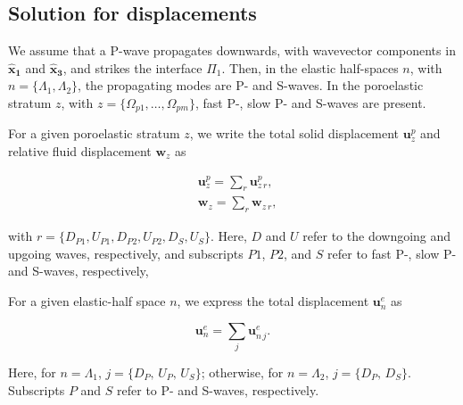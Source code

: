 \documentclass[draft]{agujournal2019}
\begin{document}
\subsection{Solution for displacements}
We assume that a P-wave propagates downwards, with wavevector components in $\bm{\hat x_1}$ and  $\bm{\hat x_3}$, and strikes the interface $\Pi_1$.  Then, in the elastic half-spaces $n$, with $n =\{\Lambda_1,\Lambda_2\}$, the propagating modes  are P- and S-waves. In the poroelastic stratum $z$, with $z=\{\Omega_{p1},\dots,\Omega_{pm}\}$, fast P-, slow P- and S-waves are present.

For a given poroelastic stratum $z$, we write the total solid displacement $\bm{u}_z^p$  and relative fluid displacement $\bm{w}_z$ as
\begin{linenomath*}
\begin{equation}\label{Eq.a7}
\begin{split}
& \bm{u}_z^{p} =  \sum_r \bm{u}_{z\,r}^p, \\
& \bm{w}_z =  \sum_r \bm{w}_{z\,r},
\end{split}
\end{equation}
\end{linenomath*}
with $r=\{D_{P1},U_{P1},D_{P2},U_{P2},D_{S},U_{S}\}$. Here, $D$ and $U$ refer to the downgoing and upgoing waves, respectively, and subscripts $P1$, $P2$, and $S$ refer to fast P-, slow P- and S-waves, respectively,

For a given elastic-half space $n$,  we express the total displacement $\bm{u}_n^e$ as
\begin{linenomath*}
\begin{equation}\label{Eq.a8}
\bm{u}_n^{e} =  \sum_j \bm{u}_{n\,j}^e.
\end{equation}
\end{linenomath*}
Here, for $n =\Lambda_1 $,  $j=\{D_P,\,U_P,\,U_S\}$; otherwise, for $n =\Lambda_2 $, $j=\{D_P,\,D_S\}$. Subscripts $P$  and $S$ refer to P- and S-waves, respectively. 
\end{document}
